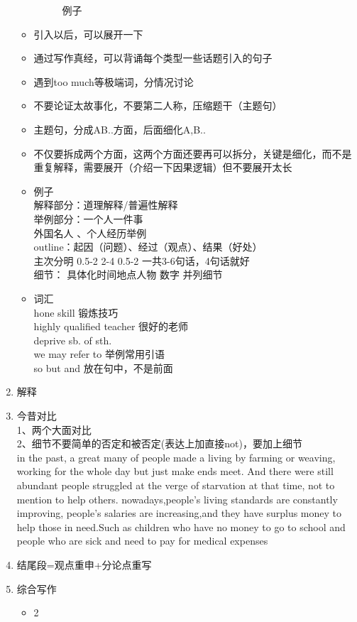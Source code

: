 \documentclass[UTF8]{ctexart}
\begin{document}
\begin{enumerate}[A]
\begin{itemize}
\begin{figure}[!htp]
        \caption{例子}
              \end{figure}
      \item 引入以后，可以展开一下
      \item 通过写作真经，可以背诵每个类型一些话题引入的句子
      \item 遇到too much等极端词，分情况讨论
      \item 不要论证太故事化，不要第二人称，压缩题干（主题句）
      \item 主题句，分成AB..方面，后面细化A,B..
      \item 不仅要拆成两个方面，这两个方面还要再可以拆分，关键是细化，而不是重复解释，需要展开（介绍一下因果逻辑）但不要展开太长
      \item 例子\\
      解释部分：道理解释/普遍性解释\\
      举例部分：一个人一件事\\
      外国名人 、个人经历举例\\
      outline：起因（问题）、经过（观点）、结果（好处）\\
      主次分明  0.5-2 2-4 0.5-2 一共3-6句话，4句话就好\\
      细节： 具体化时间地点人物 数字 并列细节\\
      \item 词汇\\
        hone skill 锻炼技巧\\
        highly qualified teacher 很好的老师\\
        deprive sb. of sth.\\
        we may refer to 举例常用引语\\
        so but and 放在句中，不是前面\\
    \end{itemize}
    \item 解释\\
    \item 今昔对比\\
    1、两个大面对比\\
    2、细节不要简单的否定和被否定(表达上加直接not)，要加上细节\\
    in the past, a great many of people made a living by farming or weaving, working for the whole day but just make ends meet. And there were still abundant people struggled at the verge of starvation at that time, not to mention to help others. nowadays,people's living standards are constantly improving, people's salaries are increasing,and they have surplus money to help those in need.Such as children who have no money to go to school and people who are sick and need to pay for medical expenses
    \item 结尾段=观点重申+分论点重写
  \item 综合写作
  \begin{itemize}
    \item 2
  \end{itemize}
\end{enumerate}
\end{document}
